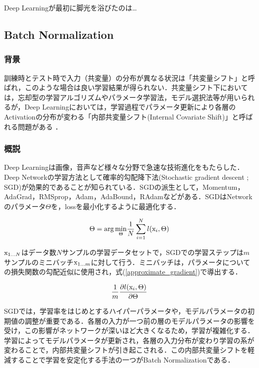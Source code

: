 \documentclass[11pt,a4paper]{jsarticle}
\begin{document}
Deep Learningが最初に脚光を浴びたのは…

\subsection{Batch Normalization}

\subsubsection{背景}
訓練時とテスト時で入力（共変量）の分布が異なる状況は「共変量シフト」と呼ばれ，このような場合は良い学習結果が得られない．共変量シフト下においては，忘却型の学習アルゴリズムやパラメータ学習法，モデル選択法等が用いられる\cite{cov_shift}が，Deep Learningにおいては，学習過程でパラメータ更新により各層のActivationの分布が変わる「内部共変量シフト(Internal Covariate Shift)」と呼ばれる問題がある\cite{bn_abs} \cite{bn_google}．

\subsubsection{概説}
Deep Learningは画像，音声など様々な分野で急速な技術進化をもたらした．Deep Networkの学習方法として確率的勾配降下法(Stochastic gradient descent ; SGD)が効果的であることが知られている\cite{sgd_overview}．SGDの派生として，Momentum，AdaGrad，RMSprop，Adam，AdaBound，RAdamなどがある．SGDはNetworkのパラメータ$\Theta$を，lossを最小化するように最適化する．

\begin{equation}
	\Theta = {\rm arg}\,\underset{\Theta}{\rm min}\frac{1}{N}\sum_{i=1}^{N}l({\rm x}_i, \Theta)
\end{equation}

${\rm x}_{1...N}$はデータ数$N$サンプルの学習データセットで，SGDでの学習ステップは$m$サンプルのミニバッチ${\rm x}_{1...m}$に対して行う．ミニバッチは，パラメータについての損失関数の勾配近似に使用され，式(\ref{approximate_gradient})で導出する．

\begin{equation}
\label{approximate_gradient}
	\frac{1}{m}\frac{\partial l({\rm x}_i, \Theta)}{\partial \Theta}
\end{equation}

SGDでは，学習率をはじめとするハイパーパラメータや，モデルパラメータの初期値の調整が重要である．各層の入力が一つ前の層のモデルパラメータの影響を受け，この影響がネットワークが深いほど大きくなるため，学習が複雑化する．学習によってモデルパラメータが更新され，各層の入力分布が変わり学習の系が変わることで，内部共変量シフトが引き起こされる．この内部共変量シフトを軽減することで学習を安定化する手法の一つがBatch Normalizationである．
\end{document}

